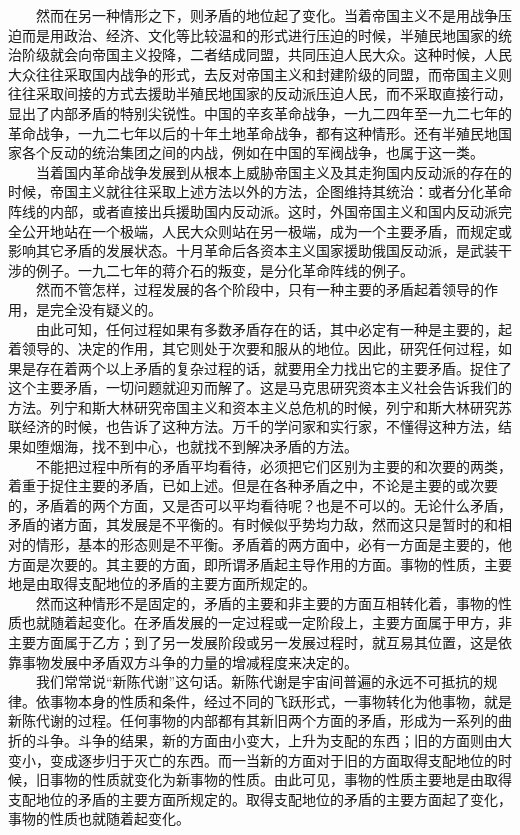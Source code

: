 \documentclass[cn,11pt,chinese]{elegantbook}
\begin{document}
　　然而在另一种情形之下，则矛盾的地位起了变化。当着帝国主义不是用战争压迫而是用政治、经济、文化等比较温和的形式进行压迫的时候，半殖民地国家的统治阶级就会向帝国主义投降，二者结成同盟，共同压迫人民大众。这种时候，人民大众往往采取国内战争的形式，去反对帝国主义和封建阶级的同盟，而帝国主义则往往采取间接的方式去援助半殖民地国家的反动派压迫人民，而不采取直接行动，显出了内部矛盾的特别尖锐性。中国的辛亥革命战争，一九二四年至一九二七年的革命战争，一九二七年以后的十年土地革命战争，都有这种情形。还有半殖民地国家各个反动的统治集团之间的内战，例如在中国的军阀战争，也属于这一类。\\
　　当着国内革命战争发展到从根本上威胁帝国主义及其走狗国内反动派的存在的时候，帝国主义就往往采取上述方法以外的方法，企图维持其统治：或者分化革命阵线的内部，或者直接出兵援助国内反动派。这时，外国帝国主义和国内反动派完全公开地站在一个极端，人民大众则站在另一极端，成为一个主要矛盾，而规定或影响其它矛盾的发展状态。十月革命后各资本主义国家援助俄国反动派，是武装干涉的例子。一九二七年的蒋介石的叛变，是分化革命阵线的例子。\\
　　然而不管怎样，过程发展的各个阶段中，只有一种主要的矛盾起着领导的作用，是完全没有疑义的。\\
　　由此可知，任何过程如果有多数矛盾存在的话，其中必定有一种是主要的，起着领导的、决定的作用，其它则处于次要和服从的地位。因此，研究任何过程，如果是存在着两个以上矛盾的复杂过程的话，就要用全力找出它的主要矛盾。捉住了这个主要矛盾，一切问题就迎刃而解了。这是马克思研究资本主义社会告诉我们的方法。列宁和斯大林研究帝国主义和资本主义总危机的时候，列宁和斯大林研究苏联经济的时候，也告诉了这种方法。万千的学问家和实行家，不懂得这种方法，结果如堕烟海，找不到中心，也就找不到解决矛盾的方法。\\
　　不能把过程中所有的矛盾平均看待，必须把它们区别为主要的和次要的两类，着重于捉住主要的矛盾，已如上述。但是在各种矛盾之中，不论是主要的或次要的，矛盾着的两个方面，又是否可以平均看待呢？也是不可以的。无论什么矛盾，矛盾的诸方面，其发展是不平衡的。有时候似乎势均力敌，然而这只是暂时的和相对的情形，基本的形态则是不平衡。矛盾着的两方面中，必有一方面是主要的，他方面是次要的。其主要的方面，即所谓矛盾起主导作用的方面。事物的性质，主要地是由取得支配地位的矛盾的主要方面所规定的。\\
　　然而这种情形不是固定的，矛盾的主要和非主要的方面互相转化着，事物的性质也就随着起变化。在矛盾发展的一定过程或一定阶段上，主要方面属于甲方，非主要方面属于乙方；到了另一发展阶段或另一发展过程时，就互易其位置，这是依靠事物发展中矛盾双方斗争的力量的增减程度来决定的。\\
　　我们常常说“新陈代谢”这句话。新陈代谢是宇宙间普遍的永远不可抵抗的规律。依事物本身的性质和条件，经过不同的飞跃形式，一事物转化为他事物，就是新陈代谢的过程。任何事物的内部都有其新旧两个方面的矛盾，形成为一系列的曲折的斗争。斗争的结果，新的方面由小变大，上升为支配的东西；旧的方面则由大变小，变成逐步归于灭亡的东西。而一当新的方面对于旧的方面取得支配地位的时候，旧事物的性质就变化为新事物的性质。由此可见，事物的性质主要地是由取得支配地位的矛盾的主要方面所规定的。取得支配地位的矛盾的主要方面起了变化，事物的性质也就随着起变化。\\
\end{document}
